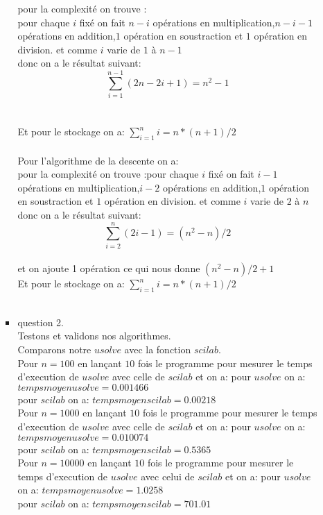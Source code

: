 \documentclass[]{article}
\begin{document}
\begin{itemize}
\begin{itemize}
\begin{itemize}
pour la complexité on trouve :\\pour chaque $i$ fixé on fait $n - i$ opérations en multiplication,$n -i -1$ opérations en addition,$1$ opération en soustraction et $1$ opération en division. et comme $i$ varie de $1$ à $n - 1$\\
donc on a le résultat suivant: $$\sum_{i=1}^{n-1}(2n - 2i + 1)=n^{2}  - 1$$\\
\\
Et pour le stockage on a: $\sum_{i=1}^{n}i=n*(n + 1)/2$\\
\\
Pour l'algorithme de la descente on a:\\
pour la complexité on trouve :pour chaque $i$ fixé on fait $i - 1$ opérations en multiplication,$i - 2$ opérations en addition,$1$ opération en soustraction et $1$ opération en division. et comme $i$ varie de $2$ à $n$\\
donc on a le résultat suivant: $$\sum_{i=2}^{n}( 2i - 1)=(n^{2}  - n)/2$$\\
et on ajoute 1 opération ce qui nous donne $(n^{2} - n)/2 + 1$
\\
Et pour le stockage on a: $\sum_{i=1}^{n}i=n*(n + 1)/2$\\
\\
\item{question 2.\\}
Testons et validons nos algorithmes.\\
Comparons notre $usolve$ avec la fonction $scilab$.\\
Pour $n=100$ en lançant $10$ fois le programme pour mesurer le temps d'execution de $usolve$ avec celle de $scilab$ et on a:
pour $usolve$ on a: $tempsmoyenusolve= 0.001466$\\
pour $scilab$ on a: $tempsmoyenscilab= 0.00218$\\

Pour $n=1000$ en lançant $10$ fois le programme pour mesurer le temps d'execution de $usolve$ avec celle de $scilab$ et on a:
pour $usolve$ on a: $tempsmoyenusolve= 0.010074$\\
pour $scilab$ on a: $tempsmoyenscilab= 0.5365$\\

Pour $n=10000$ en lançant $10$ fois le programme pour mesurer le temps d'execution de $usolve$ avec celui de $scilab$ et on a:
pour $usolve$ on a: $tempsmoyenusolve= 1.0258$\\
pour $scilab$ on a: $tempsmoyenscilab= 701.01$\\


\end{itemize}
\end{itemize}
\end{itemize}
\end{document}
